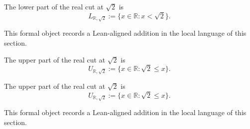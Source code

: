 \begin{remark*}
The lower part of the real cut at $\sqrt2$ is
\[
  L_{\mathbb R,\sqrt2}:=\{x\in\mathbb R:x<\sqrt2\}.
\]
\end{remark*}

\begin{remark*}[Interpretation]
This formal object records a Lean-aligned addition in the local language of this section.
\end{remark*}

\begin{dependencies}
\NoLocalDependencies
\end{dependencies}
\begin{definition}
\label{def:real-cut-upper-at-sqrt-two}
The upper part of the real cut at $\sqrt2$ is
\[
  U_{\mathbb R,\sqrt2}:=\{x\in\mathbb R:\sqrt2\le x\}.
\]
\end{definition}

\begin{remark*}
The upper part of the real cut at $\sqrt2$ is
\[
  U_{\mathbb R,\sqrt2}:=\{x\in\mathbb R:\sqrt2\le x\}.
\]
\end{remark*}

\begin{remark*}[Interpretation]
This formal object records a Lean-aligned addition in the local language of this section.
\end{remark*}

\begin{dependencies}
\NoLocalDependencies
\end{dependencies}
